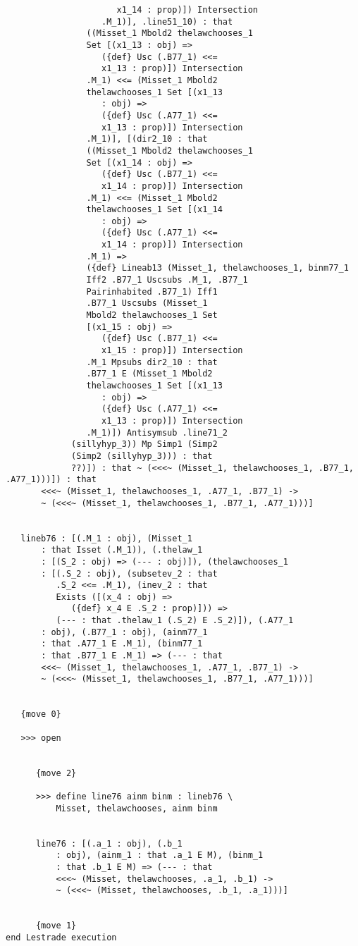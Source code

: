 \documentclass[12pt]{article}
\begin{document}
\begin{verbatim}
                      x1_14 : prop)]) Intersection 
                   .M_1)], .line51_10) : that 
                ((Misset_1 Mbold2 thelawchooses_1 
                Set [(x1_13 : obj) => 
                   ({def} Usc (.B77_1) <<= 
                   x1_13 : prop)]) Intersection 
                .M_1) <<= (Misset_1 Mbold2 
                thelawchooses_1 Set [(x1_13 
                   : obj) => 
                   ({def} Usc (.A77_1) <<= 
                   x1_13 : prop)]) Intersection 
                .M_1)], [(dir2_10 : that 
                ((Misset_1 Mbold2 thelawchooses_1 
                Set [(x1_14 : obj) => 
                   ({def} Usc (.B77_1) <<= 
                   x1_14 : prop)]) Intersection 
                .M_1) <<= (Misset_1 Mbold2 
                thelawchooses_1 Set [(x1_14 
                   : obj) => 
                   ({def} Usc (.A77_1) <<= 
                   x1_14 : prop)]) Intersection 
                .M_1) => 
                ({def} Lineab13 (Misset_1, thelawchooses_1, binm77_1 
                Iff2 .B77_1 Uscsubs .M_1, .B77_1 
                Pairinhabited .B77_1) Iff1 
                .B77_1 Uscsubs (Misset_1 
                Mbold2 thelawchooses_1 Set 
                [(x1_15 : obj) => 
                   ({def} Usc (.B77_1) <<= 
                   x1_15 : prop)]) Intersection 
                .M_1 Mpsubs dir2_10 : that 
                .B77_1 E (Misset_1 Mbold2 
                thelawchooses_1 Set [(x1_13 
                   : obj) => 
                   ({def} Usc (.A77_1) <<= 
                   x1_13 : prop)]) Intersection 
                .M_1)]) Antisymsub .line71_2 
             (sillyhyp_3)) Mp Simp1 (Simp2 
             (Simp2 (sillyhyp_3))) : that 
             ??)]) : that ~ (<<<~ (Misset_1, thelawchooses_1, .B77_1, .A77_1)))]) : that 
       <<<~ (Misset_1, thelawchooses_1, .A77_1, .B77_1) -> 
       ~ (<<<~ (Misset_1, thelawchooses_1, .B77_1, .A77_1)))]


   lineb76 : [(.M_1 : obj), (Misset_1 
       : that Isset (.M_1)), (.thelaw_1 
       : [(S_2 : obj) => (--- : obj)]), (thelawchooses_1 
       : [(.S_2 : obj), (subsetev_2 : that 
          .S_2 <<= .M_1), (inev_2 : that 
          Exists ([(x_4 : obj) => 
             ({def} x_4 E .S_2 : prop)])) => 
          (--- : that .thelaw_1 (.S_2) E .S_2)]), (.A77_1 
       : obj), (.B77_1 : obj), (ainm77_1 
       : that .A77_1 E .M_1), (binm77_1 
       : that .B77_1 E .M_1) => (--- : that 
       <<<~ (Misset_1, thelawchooses_1, .A77_1, .B77_1) -> 
       ~ (<<<~ (Misset_1, thelawchooses_1, .B77_1, .A77_1)))]


   {move 0}

   >>> open


      {move 2}

      >>> define line76 ainm binm : lineb76 \
          Misset, thelawchooses, ainm binm


      line76 : [(.a_1 : obj), (.b_1 
          : obj), (ainm_1 : that .a_1 E M), (binm_1 
          : that .b_1 E M) => (--- : that 
          <<<~ (Misset, thelawchooses, .a_1, .b_1) -> 
          ~ (<<<~ (Misset, thelawchooses, .b_1, .a_1)))]


      {move 1}
end Lestrade execution
\end{verbatim}
\end{document}
